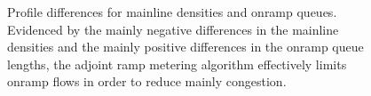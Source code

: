 							\begin{figure}[t]
								\hfill{}
																
								\caption{Profile differences for mainline densities and onramp queues. Evidenced
									by the mainly negative differences in the mainline densities and the
									mainly positive differences in the onramp queue lengths, the adjoint
									ramp metering algorithm effectively limits onramp flows in order to
									reduce mainly congestion.\label{fig:long-sim}}
							\end{figure}
														
